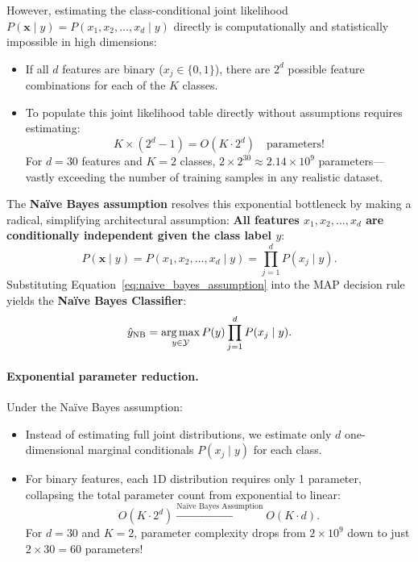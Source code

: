 However, estimating the class-conditional joint likelihood $P(\mathbf{x} \mid y) = P(x_1, x_2, \dots, x_d \mid y)$ directly is computationally and statistically impossible in high dimensions:
\begin{itemize}[noitemsep]
  \item If all $d$ features are binary ($x_j \in \{0, 1\}$), there are $2^d$ possible feature combinations for each of the $K$ classes.
  \item To populate this joint likelihood table directly without assumptions requires estimating:
  \begin{equation}
  K \times (2^d - 1) = O(K \cdot 2^d) \quad \text{parameters!}
  \end{equation}
  For $d = 30$ features and $K = 2$ classes, $2 \times 2^{30} \approx 2.14 \times 10^9$ parameters—vastly exceeding the number of training samples in any realistic dataset.
\end{itemize}

The \textbf{Naïve Bayes assumption} resolves this exponential bottleneck by making a radical, simplifying architectural assumption: \textbf{All features $x_1, x_2, \dots, x_d$ are conditionally independent given the class label $y$}:
\begin{equation}
P(\mathbf{x} \mid y) = P(x_1, x_2, \dots, x_d \mid y) = \prod_{j=1}^d P(x_j \mid y).
\label{eq:naive_bayes_assumption}
\end{equation}
Substituting Equation~\eqref{eq:naive_bayes_assumption} into the MAP decision rule yields the \textbf{Naïve Bayes Classifier}:
\begin{equation}
\hat{y}_{\text{NB}} = \operatorname*{arg\,max}_{y \in \mathcal{Y}} P(y) \prod_{j=1}^d P(x_j \mid y).
\label{eq:naive_bayes_classifier_equation}
\end{equation}

\paragraph{Exponential parameter reduction.}
Under the Naïve Bayes assumption:
\begin{itemize}[noitemsep]
  \item Instead of estimating full joint distributions, we estimate only $d$ one-dimensional marginal conditionals $P(x_j \mid y)$ for each class.
  \item For binary features, each 1D distribution requires only 1 parameter, collapsing the total parameter count from exponential to linear:
  \begin{equation}
  O(K \cdot 2^d) \xrightarrow{\text{Naïve Bayes Assumption}} O(K \cdot d).
  \label{eq:naive_bayes_complexity_collapse}
  \end{equation}
  For $d = 30$ and $K = 2$, parameter complexity drops from $2 \times 10^9$ down to just $2 \times 30 = 60$ parameters!
\end{itemize}

